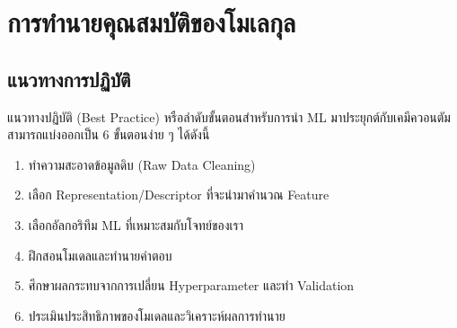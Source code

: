 

\chapter{การทำนายคุณสมบัติของโมเลกุล}
\label{ch:predict_molprop}

\section{แนวทางการปฏิบัติ}
\label{sec:pred_best_prac}

แนวทางปฏิบัติ (Best Practice) หรือลำดับขั้นตอนสำหรับการนำ ML มาประยุกต์กับเคมีควอนตัมสามารถแบ่งออกเป็น 6 ขั้นตอนง่าย ๆ ได้ดังนี้

\begin{enumerate}
    \item ทำความสะอาดข้อมูลดิบ (Raw Data Cleaning)
    \item เลือก Representation/Descriptor ที่จะนำมาคำนวณ Feature 
    \item เลือกอัลกอริทึม ML ที่เหมาะสมกับโจทย์ของเรา 
    \item ฝึกสอนโมเดลและทำนายคำตอบ
    \item ศึกษาผลกระทบจากการเปลี่ยน Hyperparameter และทำ Validation
    \item ประเมินประสิทธิภาพของโมเดลและวิเคราะห์ผลการทำนาย
\end{enumerate}

